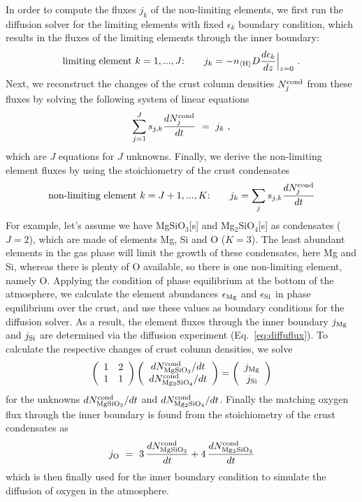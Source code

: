 \documentclass[11pt]{article}
\def\nH{n_{\langle\rm H\rangle}}
\def\ek{\epsilon_k}
\begin{document}
In order to compute the fluxes $j_k$ of the non-limiting elements,
we first run the diffusion solver for the limiting elements 
with fixed $\ek$ boundary condition, which results in the fluxes
of the limiting elements through the inner boundary:
\begin{equation}
  \mbox{limiting element $k=1,...,J$:}\quad\quad 
   j_k = -\nH D \frac{d\ek}{dz}\Big|_{z=0} \ .
  \label{eq:diffuflux}
\end{equation}
Next, we reconstruct the changes of the crust column densities
$N_j^{\rm cond}$ from these fluxes by solving the following system of
linear equations
\begin{equation}
  \sum_{j=1}^J s_{j,k} \frac{dN_j^{\rm cond}}{dt} ~=~ j_k \ ,
\end{equation}
which are $J$ equations for $J$ unknowns. Finally, we derive the
non-limiting element fluxes by using the stoichiometry of the 
crust condensates
\begin{equation}
  \mbox{non-limiting element $k=J+1,...,K$:}\quad\quad 
  j_k = \sum_j s_{j,k} \frac{dN_j^{\rm cond}}{dt}
\end{equation}
For example, let's assume we have MgSiO$_3$[s] and Mg$_2$SiO$_4$[s] as
condensates ($J=2$), which are made of elements Mg, Si and O
($K=3$). The least abundant elements in the gas phase will limit the
growth of these condensates, here Mg and Si, whereas there is plenty
of O available, so there is one non-limiting element, namely
O. Applying the condition of phase equilibrium at the bottom of the
atmosphere, we calculate the element abundances $\epsilon_{\rm Mg}$
and $\epsilon_{\rm Si}$ in phase equilibrium over the crust, and use
these values as boundary conditions for the diffusion solver. As a
result, the element fluxes through the inner boundary $j_{\rm Mg}$ and
$j_{\rm Si}$ are determined via the diffusion experiment
(Eq.~\ref{eq:diffuflux}). To calculate the respective changes of crust
column densities, we solve
\begin{equation}
  \left(\begin{array}{cc} 1 & 2 \\ 
                          1 & 1 \end{array}\right)
  \left(\begin{array}{c} dN_{\rm MgSiO_3}^{\rm cond}/dt \\ 
                         dN_{\rm Mg_2SiO_4}^{\rm cond}/dt \end{array}\right)
  = 
  \left(\begin{array}{c} j_{\rm Mg} \\ j_{\rm Si}\end{array}\right)
\end{equation}
for the unknowns $dN_{\rm MgSiO_3}^{\rm cond}/dt$ and $dN_{\rm Mg_2SiO_4}^{\rm
  cond}/dt$. Finally the matching oxygen flux through the inner 
boundary is found from the stoichiometry of the crust condensates as
\begin{equation}
  j_{\rm O} ~=~ 3\, \frac{dN_{\rm MgSiO_3}^{\rm cond}}{dt}
             + 4\, \frac{dN_{\rm Mg_2SiO_4}^{\rm cond}}{dt}
\end{equation}
which is then finally used for the inner boundary condition to simulate
the diffusion of oxygen in the atmosphere.
\end{document}
